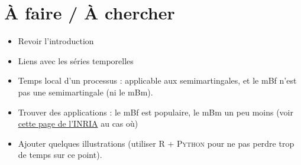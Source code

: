 



\section{À faire / À chercher}
\begin{itemize}
\item Revoir l'introduction
\item Liens avec les séries temporelles
\item Temps local d'un processus : applicable aux semimartingales, et
  le mBf n'est pas une semimartingale (ni le mBm).
\item Trouver des applications : le mBf est populaire, le mBm un peu
  moins (voir
  \href{https://team.inria.fr/anja/english-theoretical-aspects/multifractional-brownian-motion/multifractional-brownian-motion-bibliography/}{cette page de l'INRIA}
  au cas où)
\item Ajouter quelques illustrations (utiliser \textsc{R} +
  \textsc{Python} pour ne pas perdre trop de temps sur ce point).
\end{itemize}
